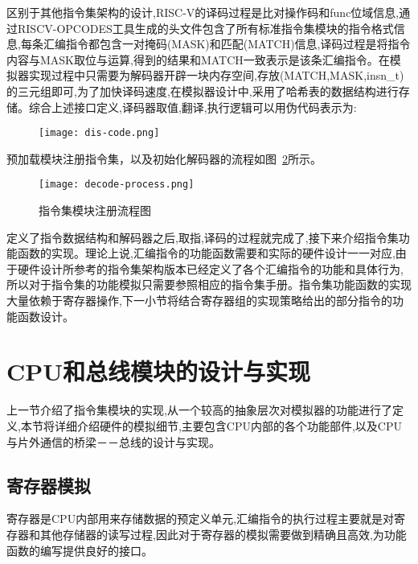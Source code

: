 区别于其他指令集架构的设计,RISC-V的译码过程是比对操作码和func位域信息,通过RISCV-OPCODES工具生成的头文件包含了所有标准指令集模块的指令格式信息,每条汇编指令都包含一对掩码(MASK)和匹配(MATCH)信息,译码过程是将指令内容与MASK取位与运算,得到的结果和MATCH一致表示是该条汇编指令。在模拟器实现过程中只需要为解码器开辟一块内存空间,存放(MATCH,MASK,insn\_t)的三元组即可,为了加快译码速度,在模拟器设计中,采用了哈希表的数据结构进行存储。综合上述接口定义,译码器取值,翻译,执行逻辑可以用伪代码表示为:
\begin{figure}[H]
    \centering
    \texttt{[image: dis-code.png]}
    \label{fig:dis-code}
\end{figure}
\vspace{-0.8cm} 
预加载模块注册指令集，以及初始化解码器的流程如图~\ref{fig:decode-process}所示。
\begin{figure}[H]
  \centering
  \texttt{[image: decode-process.png]}
  \caption{指令集模块注册流程图}
  \label{fig:decode-process}
\end{figure}


定义了指令数据结构和解码器之后,取指,译码的过程就完成了,接下来介绍指令集功能函数的实现。理论上说,汇编指令的功能函数需要和实际的硬件设计一一对应,由于硬件设计所参考的指令集架构版本已经定义了各个汇编指令的功能和具体行为,所以对于指令集的功能模拟只需要参照相应的指令集手册。指令集功能函数的实现大量依赖于寄存器操作,下一小节将结合寄存器组的实现策略给出的部分指令的功能函数设计。


\section{CPU和总线模块的设计与实现}

上一节介绍了指令集模块的实现,从一个较高的抽象层次对模拟器的功能进行了定义,本节将详细介绍硬件的模拟细节,主要包含CPU内部的各个功能部件,以及CPU与片外通信的桥梁－－总线的设计与实现。


\subsection{寄存器模拟}

寄存器是CPU内部用来存储数据的预定义单元,汇编指令的执行过程主要就是对寄存器和其他存储器的读写过程,因此对于寄存器的模拟需要做到精确且高效,为功能函数的编写提供良好的接口。


